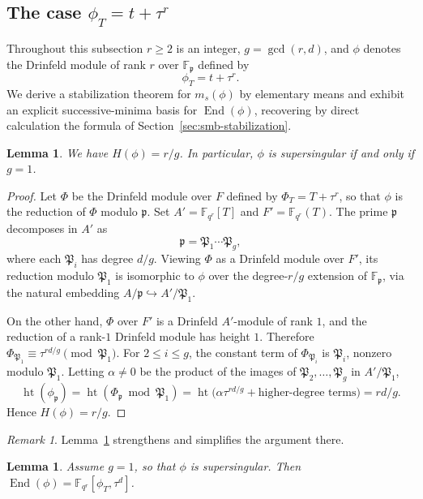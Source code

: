 \documentclass[12pt]{amsart}
\newtheorem{lem}[thm]{Lemma}
\theoremstyle{definition}
\theoremstyle{remark}
\newtheorem{rem}[thm]{Remark}
\numberwithin{equation}{section}
\numberwithin{thm}{section}
\DeclareMathOperator{\End}{End}
\DeclareMathOperator{\Ht}{ht}
\newcommand{\fP}{\mathfrak{P}}
\newcommand{\fp}{\mathfrak{p}}
\newcommand{\F}{\mathbb{F}}
\begin{document}
\subsection{The case \texorpdfstring{$\phi_T = t + \tau^r$}{phi\_T = t + tau\textasciicircum r}}\label{ssDiagonal}

Throughout this subsection $r\geq 2$ is an integer, $g = \gcd(r,d)$, and $\phi$ denotes the Drinfeld module of rank $r$ over $\F_\fp$ defined by
\[
\phi_T = t + \tau^r.
\]
We derive a stabilization theorem for $m_s(\phi)$ by elementary means and exhibit an explicit successive-minima basis for $\End(\phi)$, recovering by direct calculation the formula of Section~\ref{sec:smb-stabilization}.

\begin{lem}\label{lemDSpecial}
	We have $H(\phi) = r/g$. In particular, $\phi$ is supersingular if and only if $g = 1$.
\end{lem}

\begin{proof}
	Let $\Phi$ be the Drinfeld module over $F$ defined by $\Phi_T = T + \tau^r$, so that $\phi$ is the reduction of $\Phi$ modulo $\fp$. Set $A' = \F_{q^r}[T]$ and $F' = \F_{q^r}(T)$. The prime $\fp$ decomposes in $A'$ as
	\[
	\fp = \fP_1 \cdots \fP_g,
	\]
	where each $\fP_i$ has degree $d/g$. Viewing $\Phi$ as a Drinfeld module over $F'$, its reduction modulo $\fP_1$ is isomorphic to $\phi$ over the degree-$r/g$ extension of $\F_\fp$, via the natural embedding $A/\fp \hookrightarrow A'/\fP_1$.
	
	On the other hand, $\Phi$ over $F'$ is a Drinfeld $A'$-module of rank $1$, and the reduction of a rank-$1$ Drinfeld module has height $1$. Therefore $\Phi_{\fP_1} \equiv \tau^{rd/g} \pmod{\fP_1}$. For $2\leq i\leq g$, the constant term of $\Phi_{\fP_i}$ is $\fP_i$, nonzero modulo $\fP_1$. Letting $\alpha\neq 0$ be the product of the images of $\fP_2,\ldots,\fP_g$ in $A'/\fP_1$,
	\[
	\Ht(\phi_\fp) = \Ht(\Phi_\fp \bmod \fP_1) = \Ht\bigl(\alpha \tau^{rd/g} + \text{higher-degree terms}\bigr) = rd/g.
	\]
	Hence $H(\phi) = r/g$.
\end{proof}

\begin{rem}
	Lemma~\ref{lemDSpecial} strengthens \cite[Example 4.4.5]{PapikianGTM} and simplifies the argument there.
\end{rem}

\begin{lem}\label{lemExplicitEnd}
	Assume $g = 1$, so that $\phi$ is supersingular. Then $\End(\phi) = \F_{q^r}[\phi_T, \tau^d]$.
\end{lem}
\end{document}
